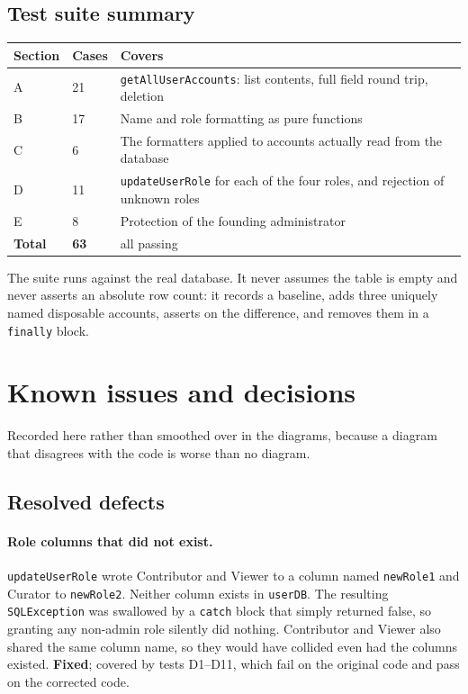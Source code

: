 \documentclass[11pt,a4paper]{article}
\newcommand{\cls}[1]{\texttt{#1}}
\begin{document}
\subsection{Test suite summary}

\begin{center}
\begin{tabularx}{\linewidth}{@{}llX@{}}
\toprule
\textbf{Section} & \textbf{Cases} & \textbf{Covers} \\
\midrule
A & 21 & \cls{getAllUserAccounts}: list contents, full field round trip, deletion \\
B & 17 & Name and role formatting as pure functions \\
C & 6 & The formatters applied to accounts actually read from the database \\
D & 11 & \cls{updateUserRole} for each of the four roles, and rejection of unknown roles \\
E & 8 & Protection of the founding administrator \\
\midrule
\textbf{Total} & \textbf{63} & all passing \\
\bottomrule
\end{tabularx}
\end{center}

The suite runs against the real database. It never assumes the table is empty and never
asserts an absolute row count: it records a baseline, adds three uniquely named disposable
accounts, asserts on the difference, and removes them in a \cls{finally} block.

\newpage
\section{Known issues and decisions}
\label{sec:issues}

Recorded here rather than smoothed over in the diagrams, because a diagram that disagrees
with the code is worse than no diagram.

\subsection{Resolved defects}

\paragraph{Role columns that did not exist.}
\label{iss:rolecols}
\cls{updateUserRole} wrote Contributor and Viewer to a column named \texttt{newRole1} and
Curator to \texttt{newRole2}. Neither column exists in \texttt{userDB}. The resulting
\cls{SQLException} was swallowed by a \cls{catch} block that simply returned false, so
granting any non-admin role silently did nothing. Contributor and Viewer also shared the
same column name, so they would have collided even had the columns existed.
\textbf{Fixed}; covered by tests D1--D11, which fail on the original code and pass on the
corrected code.
\end{document}
